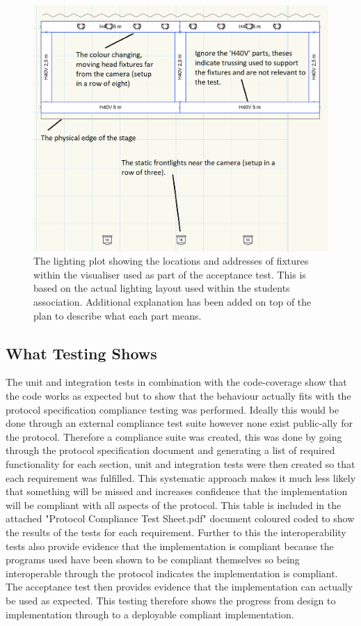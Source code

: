 \documentclass[11pt,a4paper]{article}
\begin{document}
\begin{figure}[H]
	\label{ACCEPTANCE_TEST_LX_PLOT}
	\includegraphics[width=\textwidth]{Union-Setup-Vision-File-LX-Plot.png}
	\caption{The lighting plot showing the locations and addresses of fixtures within the visualiser used as part of the acceptance test. This is based on the actual lighting layout used within the students association. Additional explanation has been added on top of the plan to describe what each part means.}
\end{figure}

\subsection{What Testing Shows}
The unit and integration tests in combination with the code-coverage show that the code works as expected but to show that the behaviour actually fits with the protocol specification compliance testing was performed. Ideally this would be done through an external compliance test suite however none exist public-ally for the protocol. Therefore a compliance suite was created, this was done by going through the protocol specification document \cite{ANSI_E1.31} and generating a list of required functionality for each section, unit and integration tests were then created so that each requirement was fulfilled. This systematic approach makes it much less likely that something will be missed and increases confidence that the implementation will be compliant with all aspects of the protocol. This table is included in the attached "Protocol Compliance Test Sheet.pdf" document coloured coded to show the results of the tests for each requirement. Further to this the interoperability tests also provide evidence that the implementation is compliant because the programs used have been shown to be compliant themselves so being interoperable through the protocol indicates the implementation is compliant. The acceptance test then provides evidence that the implementation can actually be used as expected. This testing therefore shows the progress from design to implementation through to a deployable compliant implementation.
\end{document}
